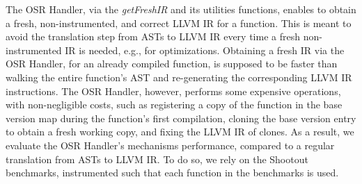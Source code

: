 
The OSR Handler, via the \textit{getFreshIR} and its utilities functions, enables to obtain a fresh, non-instrumented, and correct LLVM IR for a function.
This is meant to avoid the translation step from ASTs to LLVM IR every time a fresh non-instrumented IR is needed, e.g., for optimizations.
Obtaining a fresh IR via the OSR Handler, for an already compiled function, is supposed to be faster than walking the entire function's AST and re-generating the corresponding LLVM IR instructions.
The OSR Handler, however, performs some expensive operations, with non-negligible costs, such as registering a copy of the function in the base version map during the function's first compilation, cloning the base version entry to obtain a fresh working copy, and fixing the LLVM IR of clones.
As a result, we evaluate the OSR Handler's mechanisms performance, compared to a regular translation from ASTs to LLVM IR.
To do so, we rely on the Shootout benchmarks\cite{Shootout}, instrumented such that each function in the benchmarks is used.\\

